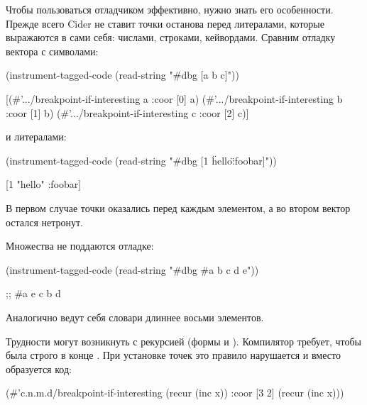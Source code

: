 
Чтобы пользоваться отладчиком эффективно, нужно знать его особенности. Прежде всего Cider не ставит точки останова перед литералами, которые выражаются в сами себя: числами, строками, кейвордами. Сравним отладку вектора с символами:

\begin{english}
  \begin{clojure}
(instrument-tagged-code
 (read-string "#dbg [a b c]"))

[(#'.../breakpoint-if-interesting a {:coor [0]} a)
 (#'.../breakpoint-if-interesting b {:coor [1]} b)
 (#'.../breakpoint-if-interesting c {:coor [2]} c)]
  \end{clojure}
\end{english}

\noindent
и литералами:

\begin{english}
  \begin{clojure}
(instrument-tagged-code
 (read-string "#dbg [1 \"hello\" :foobar]"))

[1 "hello" :foobar]
  \end{clojure}
\end{english}

В первом случае точки оказались перед каждым элементом, а во втором вектор остался нетронут.

Множества не поддаются отладке:

\begin{english}
  \begin{clojure}
(instrument-tagged-code
 (read-string "#dbg #{a b c d e}"))

;; #{a e c b d}
  \end{clojure}
\end{english}

Аналогично ведут себя словари длиннее восьми элементов.


Трудности могут возникнуть с рекурсией (формы  и ). Компилятор требует, чтобы  была строго в конце . При установке точек это правило нарушается и вместо  образуется код:

\begin{english}
  \begin{clojure}
(#'c.n.m.d/breakpoint-if-interesting
 (recur (inc x))
 {:coor [3 2]}
 (recur (inc x)))
  \end{clojure}
\end{english}

